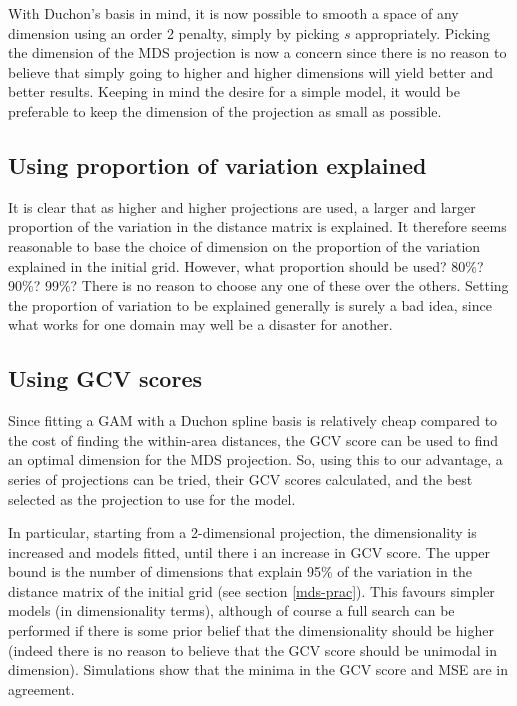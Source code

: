 With Duchon's basis in mind, it is now possible to smooth a space of any dimension using an order 2 penalty, simply by picking $s$ appropriately. Picking the dimension of the MDS projection is now a concern since there is no reason to believe that simply going to higher and higher dimensions will yield better and better results. Keeping in mind the desire for a simple model, it would be preferable to keep the dimension of the projection as small as possible.

\subsection{Using proportion of variation explained}

It is clear that as higher and higher projections are used, a larger and larger proportion of the variation in the distance matrix is explained. It therefore seems reasonable to base the choice of dimension on the proportion of the variation explained in the initial grid. However, what proportion should be used? 80\%? 90\%? 99\%? There is no reason to choose any one of these over the others. Setting the proportion of variation to be explained generally is surely a bad idea, since what works for one domain may well be a disaster for another.


\subsection{Using GCV scores}

Since fitting a GAM with a Duchon spline basis is relatively cheap compared to the cost of finding the within-area distances, the GCV score can be used to find an optimal dimension for the MDS projection. So, using this to our advantage, a series of projections can be tried, their GCV scores calculated, and the best selected as the projection to use for the model.

In particular, starting from a 2-dimensional projection, the dimensionality is increased  and models fitted, until there i an increase in GCV score. The upper bound is the number of dimensions that explain 95\% of the variation in the distance matrix of the initial grid (see section \ref{mds-prac}).  This favours simpler models (in dimensionality terms), although of course a full search can be performed if there is some prior belief that the dimensionality should be higher (indeed there is no reason to believe that the GCV score should be unimodal in dimension). Simulations show that the minima in the GCV score and MSE are in agreement.

